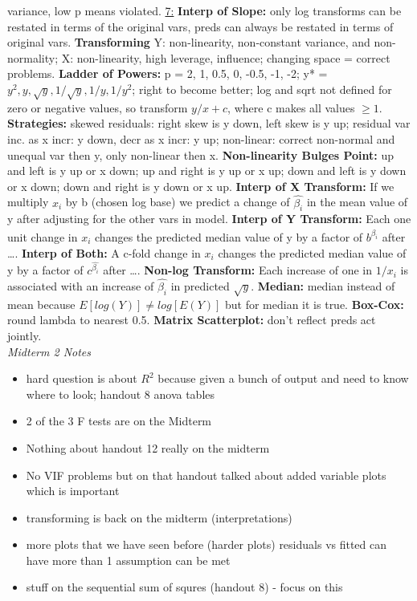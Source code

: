 \documentclass[8pt]{extarticle}
\begin{document}
variance, low p means violated.
\underline{7:}
\textbf{Interp of Slope:} only log transforms can be restated in terms of the 
original vars, preds can always be restated in terms of original vars.
\textbf{Transforming} Y: non-linearity, non-constant variance, and non-normality; 
X: non-linearity, high leverage, influence; changing space = correct problems.
\textbf{Ladder of Powers:} p = 2, 1, 0.5, 0, -0.5, -1, -2; y* = $y^2, y,
\sqrt{y}, 1/\sqrt{y}, 1/y, 1/y^2$; right to become better; log and sqrt not
defined for zero or negative values, so transform $y/x + c$, where c makes all 
values $\geq 1$.
\textbf{Strategies:} skewed residuals: right skew is y down, left skew is y up;
residual var inc. as x incr: y down, decr as x incr: y up; non-linear: correct 
non-normal and unequal var then y, only non-linear then x.
\textbf{Non-linearity Bulges Point:} up and left is y up or x down; up and 
right is y up or x up; down and left is y down or x down; down and right is y 
down or x up.
\textbf{Interp of X Transform:} If we multiply $x_i$ by b (chosen log base) we 
predict a change of $\hat{\beta_i}$ in the mean value of y after adjusting for 
the other vars in model.
\textbf{Interp of Y Transform:} Each one unit change in $x_i$ changes the 
predicted median value of y by a factor of $b^{\hat{\beta_i}}$ after \dots.
\textbf{Interp of Both:} A c-fold change in $x_i$ changes the predicted median 
value of y by a factor of $c^{\hat{\beta_i}}$ after \dots.
\textbf{Non-log Transform:} Each increase of one in $1/x_i$ is associated with 
an increase of $\hat{\beta_i}$ in predicted $\sqrt{y}$.
\textbf{Median:} median instead of mean because $E[log(Y)] \neq log[E(Y)]$ but 
for median it is true.
\textbf{Box-Cox:} round lambda to nearest 0.5.
\textbf{Matrix Scatterplot:} don't reflect preds act jointly.
\\

\textit{Midterm 2 Notes}
\begin{itemize}
    \item hard question is about $R^2$ because given a bunch of output and need 
    to know where to look; handout 8 anova tables
    \item 2 of the 3 F tests are on the Midterm
    \item Nothing about handout 12 really on the midterm
    \item No VIF problems but on that handout talked about added variable plots
    which is important
    \item transforming is back on the midterm (interpretations)
    \item more plots that we have seen before (harder plots) residuals vs fitted
    can have more than 1 assumption can be met
    \item stuff on the sequential sum of squres (handout 8) - focus on this
\end{itemize}
\end{document}
